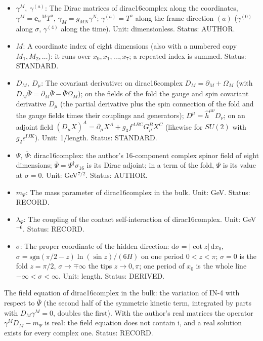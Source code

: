 \documentclass[
  10pt,
]{article}
\providecommand{\tightlist}{%
  \setlength{\itemsep}{0pt}\setlength{\parskip}{0pt}}
\begin{document}
\begin{itemize}
\tightlist
\item
  \(\gamma^M,\ \gamma^{(a)}\): The Dirac matrices of dirac16complex
  along the coordinates, \(\gamma^M = \mathbf{e}_a{}^MT^a\),
  \(\gamma_M = g_{MN}\gamma^N\); \(\gamma^{(a)} = T^a\) along the frame
  direction \((a)\) (\(\gamma^{(0)}\) along \(\sigma\), \(\gamma^{(4)}\)
  along the time). Unit: dimensionless. Status: AUTHOR.
\item
  \(M\): A coordinate index of eight dimensions (also with a numbered
  copy \(M_1, M_2, \dots\)): it runs over \(x_0, x_1, \dots, x_7\); a
  repeated index is summed. Status: STANDARD.
\item
  \(D_M,\ D_\mu\): The covariant derivative: on dirac16complex
  \(D_M = \partial_M + \Omega_M\) (with
  \(D_M\bar\Psi = \partial_M\bar\Psi - \bar\Psi\Omega_M\)); on the
  fields of the fold the gauge and spin covariant derivative \(D_\mu\)
  (the partial derivative plus the spin connection of the fold and the
  gauge fields times their couplings and generators);
  \(D^\mu = \hat h^{\mu\nu}D_\nu\); on an adjoint field
  \((D_\mu X)^A = \partial_\mu X^A + g_3f^{ABC}G^B_\mu X^C\) (likewise
  for \(SU(2)\) with \(g_2\epsilon^{IJK}\)). Unit: 1/length. Status:
  STANDARD.
\item
  \(\Psi,\ \bar\Psi\): dirac16complex: the author's 16-component complex
  spinor field of eight dimensions;
  \(\bar\Psi = \Psi^\dagger\sigma_{16}\) is its Dirac adjoint; in a term
  of the fold, \(\Psi\) is its value at \(\sigma = 0\). Unit:
  GeV\(^{7/2}\). Status: AUTHOR.
\item
  \(m_\Psi\): The mass parameter of dirac16complex in the bulk. Unit:
  GeV. Status: RECORD.
\item
  \(\lambda_\Psi\): The coupling of the contact self-interaction of
  dirac16complex. Unit: GeV\(^{-6}\). Status: RECORD.
\item
  \(\sigma\): The proper coordinate of the hidden direction:
  \(\mathrm{d}\sigma = \lvert\cot z\rvert\,\mathrm{d}x_0\),
  \(\sigma = \mathrm{sgn}(\pi/2 - z)\ln(\sin z)/(6H)\) on one period
  \(0 < z < \pi\); \(\sigma = 0\) is the fold \(z = \pi/2\),
  \(\sigma \to \mp\infty\) the tips \(z \to 0, \pi\); one period of
  \(x_0\) is the whole line \(-\infty < \sigma < \infty\). Unit: length.
  Status: DERIVED.
\end{itemize}

The field equation of dirac16complex in the bulk: the variation of IN-4
with respect to \(\bar\Psi\) (the second half of the symmetric kinetic
term, integrated by parts with \(D_M\gamma^M = 0\), doubles the first).
With the author's real matrices the operator \(\gamma^MD_M - m_\Psi\) is
real: the field equation does not contain \(\mathrm{i}\), and a real
solution exists for every complex one. Status: RECORD.
\end{document}
